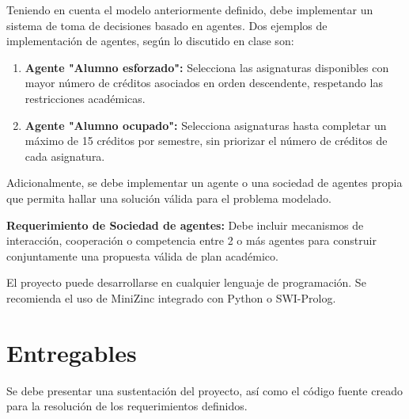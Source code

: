 \documentclass{article}
\begin{document}
Teniendo en cuenta el modelo anteriormente definido, debe implementar un sistema de toma de decisiones basado en agentes. Dos ejemplos de implementación de agentes, según lo discutido en clase son:

\begin{enumerate}
    \item \textbf{Agente "Alumno esforzado":} Selecciona las asignaturas disponibles con mayor número de créditos asociados en orden descendente, respetando las restricciones académicas.
    \item \textbf{Agente "Alumno ocupado":} Selecciona asignaturas hasta completar un máximo de 15 créditos por semestre, sin priorizar el número de créditos de cada asignatura.
\end{enumerate}

Adicionalmente, se debe implementar un agente o una sociedad de agentes propia que permita hallar una solución válida para el problema modelado.

\textbf{Requerimiento de Sociedad de agentes:}  Debe incluir mecanismos de interacción, cooperación o competencia entre 2 o más agentes para construir conjuntamente una propuesta válida de plan académico. \newline


El proyecto puede desarrollarse en cualquier lenguaje de programación. Se recomienda el uso de MiniZinc integrado con Python o SWI-Prolog.

\section{Entregables}
Se debe presentar una sustentación del proyecto, así como el código fuente creado para la resolución de los requerimientos definidos.
\end{document}
